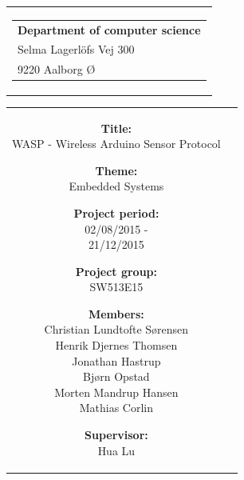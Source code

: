 
\thispagestyle{empty}

{\samepage 
\begin{tabular}{r}
	\parbox{\textwidth}{  
	\hfill \parbox{7cm}{\begin{tabular}{l} %
		{\small \textbf{Department of computer science}}\\
		{\small Selma Lagerlöfs Vej 300} \\
		{\small 9220 Aalborg Ø}
	\end{tabular}}
	}
\end{tabular}

\begin{tabular}{cc}
	\parbox{8cm}{
	\begin{description}
		\item { \textbf{Title:}}\\ 
			WASP - Wireless Arduino Sensor Protocol
    		\item { \textbf{Theme:}}\\ 
			Embedded Systems\\
	\end{description}
	
	\parbox{8cm}{
	\begin{description}
		\item { \textbf{Project period:}}\\
			02/08/2015 -\\
			21/12/2015\\
 		\hspace{4cm}
		\item { \textbf{Project group:}}\\
  			SW513E15\\
 		\hspace{4cm}
		\item {\textbf{Members:}}\\
            Christian Lundtofte Sørensen\\
            Henrik Djernes Thomsen\\
            Jonathan Hastrup\\
            Bjørn Opstad\\
            Morten Mandrup Hansen\\
            Mathias Corlin\\
		\hspace{2cm}
		\item { \textbf{Supervisor:}}\\
 			Hua Lu\\
  	\end{description} 
	}

}
\end{tabular}}
